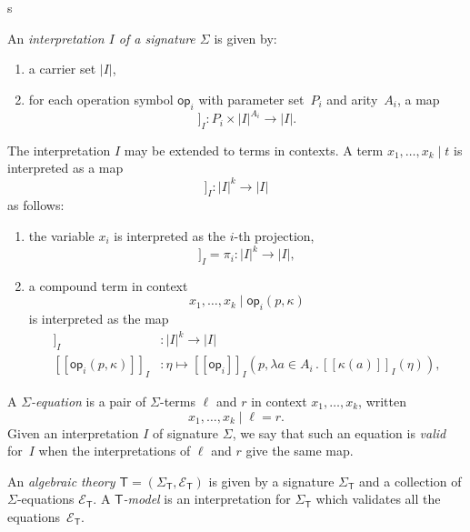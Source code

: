 s\documentclass{amsart}
\newcommand{\theory}[1]{\mathsf{#1}} %
\newcommand{\signature}[1]{\Sigma_{\theory{#1}}} %
\newcommand{\equations}[1]{\mathcal{E}_{\theory{#1}}} %
\newcommand{\carrier}[1]{|#1|} %
\newcommand{\lam}[1]{\lambda #1 \,.\,}
\newcommand{\op}[1]{\mathsf{op}_{#1}} %
\newcommand{\sem}[1]{[\![#1]\!]} %
\begin{document}
An \emph{interpretation $I$ of a signature $\Sigma$} is given by:
%
\begin{enumerate}
\item a carrier set $\carrier{I}$,
\item for each operation symbol $\op{i}$ with parameter set~$P_i$ and arity~$A_i$,
  a map
  \begin{equation*}
    \sem{\op{i}}_I : P_i \times \carrier{I}^{A_i} \longrightarrow \carrier{I}.
  \end{equation*}
\end{enumerate}
%
The interpretation $I$ may be extended to terms in contexts. A term
$x_1, \ldots, x_k \mid t$ is interpreted as a map
%
\begin{equation*}
  \sem{x_1, \ldots, x_k \mid t}_I : \carrier{I}^k \to \carrier{I}
\end{equation*}
%
as follows:
%
\begin{enumerate}
\item the variable $x_i$ is interpreted as the $i$-th projection,
  \begin{equation*}
    \sem{x_1, \ldots, x_k \mid  x_i}_I = \pi_i : \carrier{I}^k \to \carrier{I},
  \end{equation*}
\item a compound term in context
  \begin{equation*}
    x_1, \ldots, x_k \mid \op{i}(p, \kappa)
  \end{equation*}
  is interpreted as the map
  \begin{align*}
    \sem{\op{i}(p, \kappa)}_I &: \carrier{I}^k \longrightarrow \carrier{I} \\
    \sem{\op{i}(p, \kappa)}_I &:
      \eta \mapsto
      \sem{\op{i}}_I(p, \lam{a \in A_i} \sem{\kappa(a)}_I(\eta)),
  \end{align*}
\end{enumerate}

A \emph{$\Sigma$-equation} is a pair of $\Sigma$-terms $\ell$ and $r$ in context
$x_1, \ldots, x_k$, written
%
\begin{equation*}
  x_1, \ldots, x_k \mid \ell = r.
\end{equation*}
%
Given an interpretation $I$ of signature $\Sigma$, we say that such an equation
is \emph{valid} for~$I$ when the interpretations of $\ell$ and $r$ give the same
map.

An \emph{algebraic theory $\theory{T} = (\signature{T}, \equations{T})$} is
given by a signature $\signature{T}$ and a collection of $\Sigma$-equations
$\equations{T}$. A \emph{$\theory{T}$-model} is an interpretation for
$\signature{T}$ which validates all the equations~$\equations{T}$.
\end{document}
